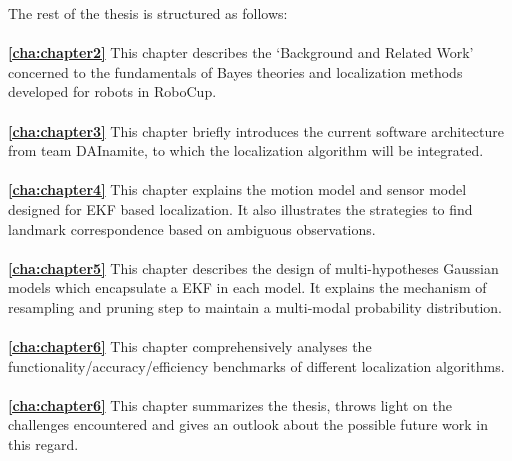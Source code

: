 The rest of the thesis is structured as follows:
\\
\\
\textbf{\autoref{cha:chapter2}} This chapter describes the `Background and Related Work' concerned to the fundamentals of Bayes theories and localization methods developed for robots in RoboCup. 
\\
\\
\textbf{\autoref{cha:chapter3}} This chapter briefly introduces the current software architecture from team DAInamite, to which the localization algorithm will be integrated.  
\\
\\
\textbf{\autoref{cha:chapter4}} This chapter explains the motion model and sensor model designed for \gls{EKF} based localization. It also illustrates the strategies to find landmark correspondence based on ambiguous observations. 
\\
\\
\textbf{\autoref{cha:chapter5}} This chapter describes the design of multi-hypotheses Gaussian models which encapsulate a \gls{EKF} in each model. It explains the mechanism of resampling and pruning step to maintain a multi-modal probability distribution.
\\
\\
\textbf{\autoref{cha:chapter6}} This chapter comprehensively analyses the functionality/accuracy/efficiency benchmarks of different localization algorithms.
\\
\\
\textbf{\autoref{cha:chapter6}} This chapter summarizes the thesis, throws light on the challenges encountered and gives an outlook about the possible future work in this regard.
\\
\\
